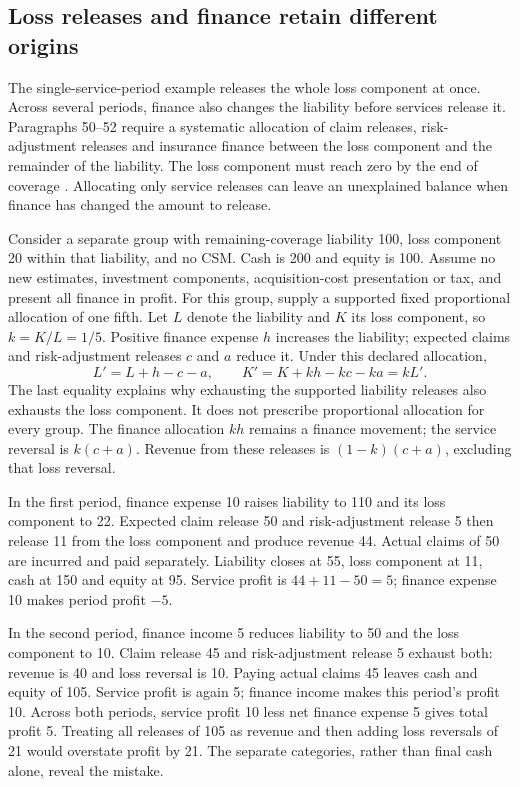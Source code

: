 \subsection{Loss releases and finance retain different origins}
\label{sec:insurance-service-finance-origins}

The single-service-period example releases the whole loss component at once.
Across several periods, finance also changes the liability before services
release it. Paragraphs 50--52 require a systematic allocation of claim releases,
risk-adjustment releases and insurance finance between the loss component and
the remainder of the liability. The loss component must reach zero by the end
of coverage \citep[IFRS~17.49--52]{eu20231803}. Allocating only service releases
can leave an unexplained balance when finance has changed the amount to release.

Consider a separate group with remaining-coverage liability 100, loss component
20 within that liability, and no CSM. Cash is 200 and equity is 100. Assume
no new estimates, investment components, acquisition-cost presentation or tax,
and present all finance in profit. For this group, supply a supported fixed
proportional allocation of one fifth. Let \(L\) denote the liability and
\(K\) its loss component, so \(k=K/L=1/5\). Positive finance expense
\(h\) increases the liability; expected claims and risk-adjustment releases
\(c\) and \(a\) reduce it. Under this declared allocation,
\[
 L'=L+h-c-a,\qquad
 K'=K+k h-kc-ka=kL'.
\]
The last equality explains why exhausting the supported liability releases also
exhausts the loss component. It does not prescribe proportional allocation for
every group. The finance allocation \(kh\) remains a finance movement; the
service reversal is \(k(c+a)\). Revenue from these releases is
\((1-k)(c+a)\), excluding that loss reversal.

In the first period, finance expense 10 raises liability to 110 and its loss
component to 22. Expected claim release 50 and risk-adjustment release 5 then
release 11 from the loss component and produce revenue 44. Actual claims of
50 are incurred and paid separately. Liability closes at 55, loss component
at 11, cash at 150 and equity at 95. Service profit is
\(44+11-50=5\); finance expense 10 makes period profit \(-5\).

In the second period, finance income 5 reduces liability to 50 and the loss
component to 10. Claim release 45 and risk-adjustment release 5 exhaust both:
revenue is 40 and loss reversal is 10. Paying actual claims 45 leaves cash
and equity of 105. Service profit is again 5; finance income makes this period's
profit 10. Across both periods, service profit 10 less net finance expense 5
gives total profit 5. Treating all releases of 105 as revenue and then adding
loss reversals of 21 would overstate profit by 21. The separate categories,
rather than final cash alone, reveal the mistake.

